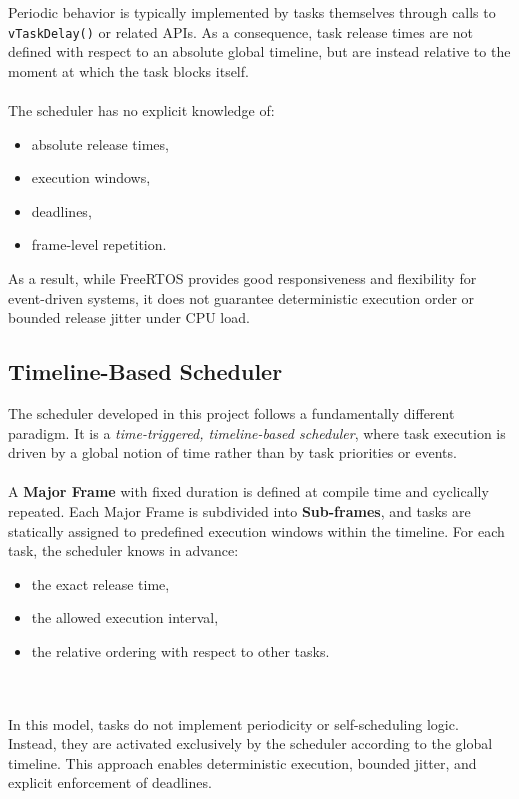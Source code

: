 \documentclass[12pt,english, makeidx, a4paper, titlepage,oneside]{article}
\begin{document}
\noindent Periodic behavior is typically implemented by tasks themselves through calls to \texttt{vTaskDelay()} or related APIs. As a consequence, task release times are not defined with respect to an absolute global timeline, but are instead relative to the moment at which the task blocks itself.
\\~\\
\noindent The scheduler has no explicit knowledge of:
\begin{itemize}
    \item absolute release times,
    \item execution windows,
    \item deadlines,
    \item frame-level repetition.
\end{itemize}

\noindent As a result, while FreeRTOS provides good responsiveness and flexibility for event-driven systems, it does not guarantee deterministic execution order or bounded release jitter under CPU load.

\subsection{Timeline-Based Scheduler}

The scheduler developed in this project follows a fundamentally different paradigm.  
It is a \emph{time-triggered, timeline-based scheduler}, where task execution is driven by a global notion of time rather than by task priorities or events.
\\~\\
A \textbf{Major Frame} with fixed duration is defined at compile time and cyclically repeated. Each Major Frame is subdivided into \textbf{Sub-frames}, and tasks are statically assigned to predefined execution windows within the timeline. For each task, the scheduler knows in advance:
\begin{itemize}
    \item the exact release time,
    \item the allowed execution interval,
    \item the relative ordering with respect to other tasks.
\end{itemize}
\\~\\
In this model, tasks do not implement periodicity or self-scheduling logic. Instead, they are activated exclusively by the scheduler according to the global timeline. This approach enables deterministic execution, bounded jitter, and explicit enforcement of deadlines.
\end{document}
